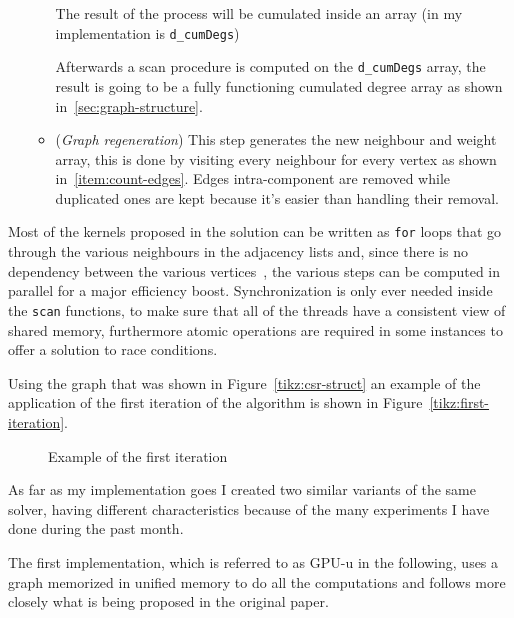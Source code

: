 \documentclass[a4paper,10pt]{article}
\begin{document}
\begin{enumerate}
\begin{itemize}
		The result of the process will be cumulated inside an array (in my
		implementation is \texttt{d\_cumDegs})

		Afterwards a scan procedure is computed on the \texttt{d\_cumDegs}
		array, the result is going to be a fully functioning cumulated
		degree array as shown in~\ref{sec:graph-structure}.
		\item\label{item:graph-regen} (\textit{Graph regeneration}) This step
		generates the new neighbour and weight array, this is done by
		visiting every neighbour for every vertex as shown in~\ref{item:count-edges}. Edges intra-component are removed while duplicated ones are kept because it's easier than handling their removal.
	\end{itemize}
\end{enumerate}
Most of the kernels proposed in the solution can be written as \texttt{for} loops that go through
the various neighbours in the adjacency lists and, since there is no dependency between the various vertices~\cite{generic-he-boruvka}, the various steps can be computed in parallel for a major efficiency boost. Synchronization is only ever needed inside the \texttt{scan} functions, to make sure that all of the threads have a consistent view of shared memory, furthermore atomic operations are required in some instances to offer a solution to race conditions.

Using the graph that was shown in Figure~\ref{tikz:csr-struct} an example of the application of the first iteration of the algorithm is shown in Figure~\ref{tikz:first-iteration}.
\begin{figure}
	
	\caption{Example of the first iteration}
\end{figure}

As far as my implementation goes I created two similar variants of the same solver, having different characteristics because of the many experiments I have done during the past month.

The first implementation, which is referred to as GPU-u in the following, uses a graph memorized in unified memory to do all the computations and follows more closely what is being proposed in the original paper.
\end{document}
